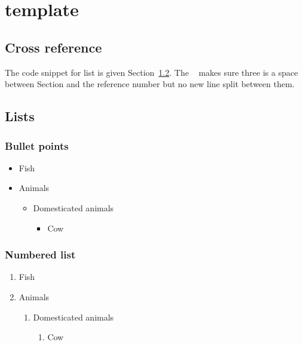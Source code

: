 \chapter{template}

\section{Cross reference} \label{template_cross_reference}

The code snippet for list is given Section~\ref{template_list}.
The \texttt{~} makes sure three is a space between Section and the reference number but no new line split between them.



\section{Lists} \label{template_list}

\subsection{Bullet points}
\begin{itemize}
  \item Fish
  \item Animals
  \begin{itemize}
    \item Domesticated animals
    \begin{itemize}
      \item Cow
    \end{itemize}
  \end{itemize}
\end{itemize}

\subsection{Numbered list}

\begin{enumerate}
  \item Fish
  \item Animals
  \begin{enumerate}
    \item Domesticated animals
    \begin{enumerate}
      \item Cow
    \end{enumerate}
  \end{enumerate}
\end{enumerate}

